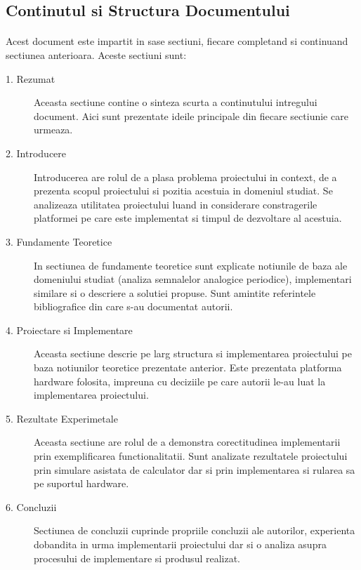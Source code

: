\subsection{Continutul si Structura Documentului}
\paragraph{}
Acest document este impartit in sase sectiuni, fiecare completand si continuand sectiunea anterioara. Aceste sectiuni sunt:

\renewcommand{\labelitemi}{$\bullet$}
\begin{description}

	\item[1. Rezumat]
		Aceasta sectiune contine o sinteza scurta a continutului intregului document. Aici sunt prezentate ideile principale din fiecare sectiunie care urmeaza.
		
	\item[2. Introducere] 
		Introducerea are rolul de a plasa problema proiectului in context, de a prezenta scopul proiectului si pozitia acestuia in domeniul studiat. Se analizeaza utilitatea proiectului luand in considerare constragerile platformei pe care este implementat si timpul de dezvoltare al acestuia.
		
	\item[3. Fundamente Teoretice]
		In sectiunea de fundamente teoretice sunt explicate notiunile de baza ale domeniului studiat (analiza semnalelor analogice periodice), implementari similare si o descriere a solutiei propuse. Sunt amintite referintele bibliografice din care s-au documentat autorii.
		
	\item[4. Proiectare si Implementare]
		Aceasta sectiune descrie pe larg structura si implementarea proiectului pe baza notiunilor teoretice prezentate anterior. Este prezentata platforma hardware folosita, impreuna cu deciziile pe care autorii le-au luat la implementarea proiectului.
		
	\item[5. Rezultate Experimetale]
		Aceasta sectiune are rolul de a demonstra corectitudinea implementarii prin exemplificarea functionalitatii. Sunt analizate rezultatele proiectului prin simulare asistata de calculator dar si prin implementarea si rularea sa pe suportul hardware.
		
	\item[6. Concluzii]
		Sectiunea de concluzii cuprinde propriile concluzii ale autorilor, experienta dobandita in urma implementarii proiectului dar si o analiza asupra procesului de implementare si produsul realizat.
		
\end{description}


\clearpage